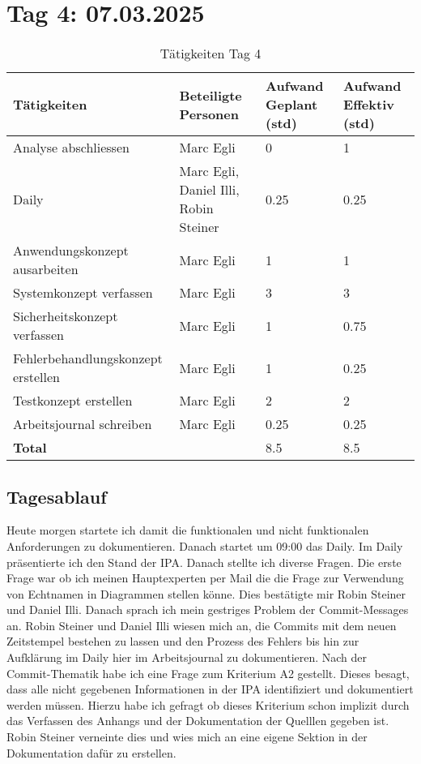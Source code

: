 \section{Tag 4: 07.03.2025}
\begin{table}[H]
    \begin{tabular}{|L{0.4\textwidth}|C{60pt}|C{60pt}|C{60pt}|}
        \hline
        \color{white}Tätigkeiten & \color{white}Beteiligte \color{white}Personen & \color{white}Aufwand Geplant (std) & \color{white}Aufwand Effektiv (std) \\
        \hline
        Analyse abschliessen & Marc Egli & 0 & 1 \\
        \hline
        Daily & Marc Egli, Daniel Illi, Robin Steiner & 0.25 & 0.25 \\
        \hline
        Anwendungskonzept ausarbeiten & Marc Egli & 1 & 1 \\
        \hline
        Systemkonzept verfassen & Marc Egli & 3 & 3 \\
        \hline
        Sicherheitskonzept verfassen & Marc Egli & 1 & 0.75 \\
        \hline
        Fehlerbehandlungskonzept erstellen & Marc Egli & 1 & 0.25 \\
        \hline
        Testkonzept erstellen & Marc Egli & 2 & 2 \\
        \hline
        Arbeitsjournal schreiben & Marc Egli & 0.25 & 0.25 \\
        \hline
        \textbf{Total} &  & 8.5 & 8.5 \\
    \hline
    \end{tabular}
    \caption{Tätigkeiten Tag 4}
\end{table}

\subsection*{Tagesablauf}
Heute morgen startete ich damit die funktionalen und nicht funktionalen Anforderungen zu dokumentieren. 
Danach startet um 09:00 das Daily. Im Daily präsentierte ich den Stand der IPA. Danach stellte ich diverse Fragen. Die
erste Frage war ob ich meinen Hauptexperten per Mail die die Frage zur Verwendung von Echtnamen in Diagrammen stellen könne. Dies
bestätigte mir Robin Steiner und Daniel Illi. Danach sprach ich mein gestriges Problem der Commit-Messages an. Robin Steiner und Daniel Illi
wiesen mich an, die Commits mit dem neuen Zeitstempel bestehen zu lassen und den Prozess des Fehlers bis hin zur Aufklärung im Daily
hier im Arbeitsjournal zu dokumentieren. Nach der Commit-Thematik habe ich eine Frage zum Kriterium A2 gestellt. Dieses besagt, dass alle
nicht gegebenen Informationen in der IPA identifiziert und dokumentiert werden müssen. Hierzu habe ich gefragt ob dieses Kriterium schon implizit durch das
Verfassen des Anhangs und der Dokumentation der Quelllen gegeben ist. Robin Steiner verneinte dies und wies mich an eine eigene Sektion in der Dokumentation
dafür zu erstellen.

